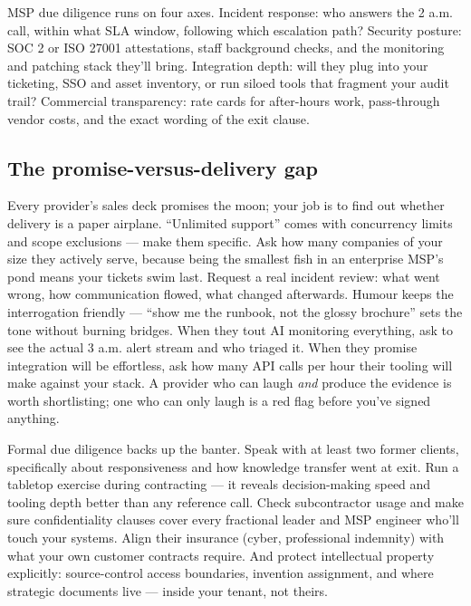MSP due diligence runs on four axes. Incident response: who answers the 2 a.m. call, within what SLA window, following which escalation path? Security posture: SOC 2 or ISO 27001 attestations, staff background checks, and the monitoring and patching stack they'll bring. Integration depth: will they plug into your ticketing, SSO and asset inventory, or run siloed tools that fragment your audit trail? Commercial transparency: rate cards for after-hours work, pass-through vendor costs, and the exact wording of the exit clause.



\subsection{The promise-versus-delivery gap}


Every provider's sales deck promises the moon; your job is to find out whether delivery is a paper airplane. ``Unlimited support'' comes with concurrency limits and scope exclusions — make them specific. Ask how many companies of your size they actively serve, because being the smallest fish in an enterprise MSP's pond means your tickets swim last. Request a real incident review: what went wrong, how communication flowed, what changed afterwards. Humour keeps the interrogation friendly — ``show me the runbook, not the glossy brochure'' sets the tone without burning bridges. When they tout AI monitoring everything, ask to see the actual 3 a.m. alert stream and who triaged it. When they promise integration will be effortless, ask how many API calls per hour their tooling will make against your stack. A provider who can laugh \emph{and} produce the evidence is worth shortlisting; one who can only laugh is a red flag before you've signed anything.


Formal due diligence backs up the banter. Speak with at least two former clients, specifically about responsiveness and how knowledge transfer went at exit. Run a tabletop exercise during contracting — it reveals decision-making speed and tooling depth better than any reference call. Check subcontractor usage and make sure confidentiality clauses cover every fractional leader and MSP engineer who'll touch your systems. Align their insurance (cyber, professional indemnity) with what your own customer contracts require. And protect intellectual property explicitly: source-control access boundaries, invention assignment, and where strategic documents live — inside your tenant, not theirs.



